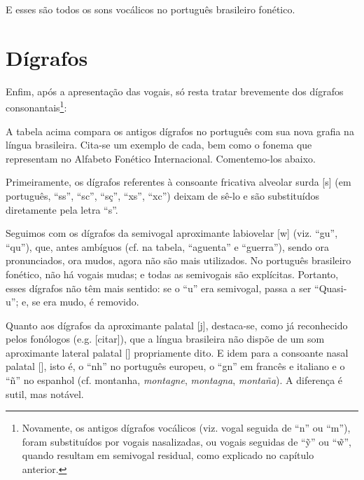\documentclass[12pt, a5paper, titlepage]{article}
\begin{document}
\begin{bilingualpages}
    E esses são todos os sons vocálicos no português brasileiro fonético.



    \section{Dígrafos}
    Enfim, após a apresentação das vogais, só resta tratar brevemente dos dígrafos consonantais\footnote{
        Novamente, os antigos dígrafos vocálicos (viz. vogal seguida de ``n'' ou ``m''), foram substituídos por vogais nasalizadas, ou vogais seguidas de ``\~y'' ou ``\~w'', quando resultam em semivogal residual, como explicado no capítulo anterior.
    }:

    \PtTableDigraphs

    A tabela acima compara os antigos dígrafos no português com sua nova grafia na língua brasileira. Cita-se um exemplo de cada, bem como o fonema que representam no Alfabeto Fonético Internacional. Comentemo-los abaixo.

    Primeiramente, os dígrafos referentes à consoante fricativa alveolar surda [s] (em português, ``ss'', ``sc'', ``sç'', ``xs'', ``xc'') deixam de sê-lo e são substituídos diretamente pela letra ``s''.

    Seguimos com os dígrafos da semivogal aproximante labiovelar [w] (viz. ``gu'', ``qu''), que, antes ambíguos (cf. na tabela,   ``aguenta'' e ``guerra''), sendo ora pronunciados, ora mudos, agora não são mais utilizados. No português brasileiro fonético, não há vogais mudas; e todas as semivogais são explícitas. Portanto, esses dígrafos não têm mais sentido: se o ``u'' era semivogal, passa a ser ``Quasi-u''; e, se era mudo, é removido.

    Quanto aos dígrafos da aproximante palatal [j], destaca-se, como já reconhecido pelos fonólogos (e.g. [citar]), que a língua brasileira não dispõe de um som aproximante lateral palatal [\textturny] propriamente dito. E idem para a consoante nasal palatal [\textltailn], isto é, o ``nh'' no português europeu, o ``gn'' em francês e italiano e o ``ñ'' no espanhol (cf. 
    montanha, \textit{montagne}, \textit{montagna}, \textit{montaña}). A diferença é sutil, mas notável.
    

\end{bilingualpages}
\end{document}
